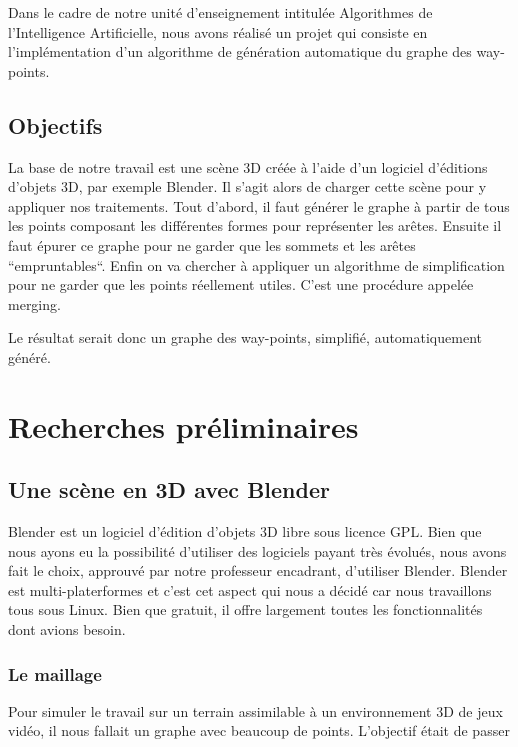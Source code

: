 \documentclass[a4paper,12pt]{report}
\begin{document}
Dans le cadre de notre unité d'enseignement intitulée Algorithmes de l'Intelligence Artificielle, nous avons réalisé un projet qui consiste en l'implémentation d'un algorithme de génération automatique du graphe des way-points.


\section*{Objectifs}

La base de notre travail est une scène 3D créée à l'aide d'un logiciel d'éditions d'objets 3D, par exemple Blender. Il s'agit alors de charger cette scène pour y appliquer nos traitements. Tout d'abord, il faut générer le graphe à partir de tous les points composant les différentes formes pour représenter les arêtes. Ensuite il faut épurer ce graphe pour ne garder que les sommets et les arêtes ``empruntables``. Enfin on va chercher à appliquer un algorithme de simplification pour ne garder que les points réellement utiles. C'est une procédure appelée merging.

Le résultat serait donc un graphe des way-points, simplifié, automatiquement généré.

\chapter{Recherches préliminaires}

\section{Une scène en 3D avec Blender}

Blender est un logiciel d'édition d'objets 3D libre sous licence GPL. Bien que nous ayons eu la possibilité d'utiliser des logiciels payant très évolués, nous avons fait le choix, approuvé par notre professeur encadrant, d'utiliser Blender. Blender est multi-platerformes et c'est cet aspect qui nous a décidé car nous travaillons tous sous Linux. Bien que gratuit, il offre largement toutes les fonctionnalités dont avions besoin.

\subsection{Le maillage}

Pour simuler le travail sur un terrain assimilable à un environnement 3D de jeux vidéo, il nous fallait un graphe avec beaucoup de points. L'objectif était de passer 
\end{document}
